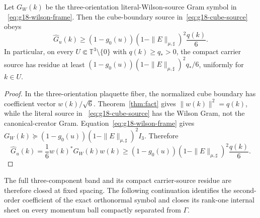 \begin{corollary}
\label{lem:g18-one-estimate}
Let $G_W(k)$ be the three-orientation literal-Wilson-source Gram symbol in
~\eqref{eq:g18-wilson-frame}.  Then the cube-boundary source
in~\eqref{eq:g18-cube-source} obeys
\begin{equation}
 \widehat G_u(k)
 \ge(1-g_0(u))
       (1-\|E\|_{\mu,\sharp})^2\frac{q(k)}6 .
 \label{eq:g18-positive-residue}
\end{equation}
In particular, on every $U\Subset\mathbb T^3\setminus\{0\}$ with
$q(k)\ge q_*>0$, the compact carrier source has residue at least
$(1-g_0(u))(1-\|E\|_{\mu,\sharp})^2q_*/6$, uniformly for $k\in U$.
\end{corollary}

\begin{proof}
In the three-orientation plaquette fiber, the normalized cube boundary has
coefficient vector $w(k)/\sqrt6$.  Theorem~\ref{thm:fact} gives
$\|w(k)\|^2=q(k)$, while the literal source in
~\eqref{eq:g18-cube-source} has the Wilson Gram, not the canonical-creator
Gram.  Equation~\eqref{eq:g18-wilson-frame} gives
$G_W(k)\succeq(1-g_0(u))(1-\|E\|_{\mu,\sharp})^2I_3$.  Therefore
\[
 \widehat G_u(k)
 =\frac16w(k)^*G_W(k)w(k)
 \ge(1-g_0(u))(1-\|E\|_{\mu,\sharp})^2\frac{q(k)}6 .
\]
\end{proof}

The full three-component band and its compact carrier-source residue are
therefore closed at fixed spacing.  The following continuation identifies the
second-order coefficient of the exact orthonormal symbol and closes its
rank-one internal sheet on every momentum ball compactly separated from
$\Gamma$.


